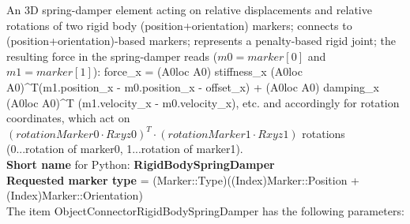 An 3D spring-damper element acting on relative displacements and relative rotations of two rigid body (position+orientation) markers; connects to (position+orientation)-based markers; represents a penalty-based rigid joint; the resulting force in the spring-damper reads ($m0 = marker[0]$ and $m1 = marker[1]$): \be force_x = (A0loc \cdot A0) \cdot stiffness_x \cdot (A0loc \cdot A0)^T(m1.position_x - m0.position_x - offset_x) + (A0loc \cdot A0) \cdot damping_x \cdot (A0loc \cdot A0)^T (m1.velocity_x - m0.velocity_x), etc. \ee and accordingly for rotation coordinates, which act on $(rotationMarker0 \cdot Rxyz0)^T \cdot (rotationMarker1 \cdot Rxyz1) $ rotations (0...rotation of marker0, 1...rotation of marker1).
 \\
{\bf Short name} for Python: {\bf RigidBodySpringDamper}
 \\  {\bf Requested marker type} = (Marker::Type)((Index)Marker::Position + (Index)Marker::Orientation) \\ 
The item ObjectConnectorRigidBodySpringDamper has the following parameters:
